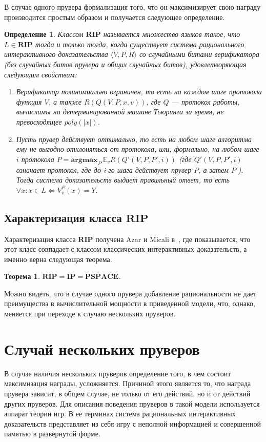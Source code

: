\documentclass[14pt, a4paper]{extreport}
\newtheorem{theorem}{\indent Теорема}
\newtheorem{definition}{\indent Определение}
\newcommand{\poly}{\textit{poly}}
\begin{document}
В случае одного прувера формализация того, что он максимизирует свою награду производится простым образом и получается следующее определение.
\begin{definition}\label{rip}
    Классом $\textbf{RIP}$ называется множество языков такое, что $L \in \textbf{RIP}$ тогда и только тогда, когда существует система рационального интерактивного доказательства $\langle V, P, R\rangle$ со случайными битами верификатора (без случайных битов прувера и общих случайных битов), удовлетворяющая следующим свойствам:
    \begin{enumerate}
        \item Верификатор полиномиально ограничен, то есть на каждом шаге протокола функция $V$, а также $R(Q(V, P, x, v))$, где $Q$ --- протокол работы, вычислимы на детерминированной машине Тьюринга за время, не превосходящее $\poly(|x|)$.
        \item Пусть прувер действует оптимально, то есть на любом шаге алгоритма ему не выгодно отклоняться от протокола, или, формально, на любом шаге $i$ протокола $P = \textbf{argmax}_{P'} \mathbb{E}_v R(Q'(V, P, P', i))$ (где $Q'(V, P, P', i)$ означает протокол, где до i-го шага действует прувер $P$, а затем $P'$). Тогда система доказательств выдает правильный ответ, то есть $\forall x: x \in L \iff V^{P}_{v}(x) = Y$.
        \end{enumerate}
    \end{definition}

    \section{Характеризация класса $\textbf{RIP}$}
    Характеризация класса $\textbf{RIP}$ получена Azar и Micali в~\cite{azar2012rational}, где показывается, что этот класс совпадает с классом классических интерактивных доказательств, а именно верна следующая теорема.
    \begin{theorem}
        $\textbf{RIP} = \textbf{IP} = \textbf{PSPACE}$.
    \end{theorem}
    Можно видеть, что в случае одного прувера добавление рациональности не дает преимущества в вычислительной мощности в приведенной модели, что, однако, меняется при переходе к случаю нескольких пруверов.
        \chapter{Случай нескольких пруверов}
        В случае наличия нескольких пруверов определение того, в чем состоит максимизация награды, усложняется. Причиной этого является то, что награда прувера зависит, в общем случае, не только от его действий, но и от действий других пруверов. Для описания поведения пруверов в такой модели используется аппарат теории игр. В ее терминах система рациональных интерактивных доказательств представляет из себя игру с неполной информацией и совершенной памятью в развернутой форме.
\end{document}
